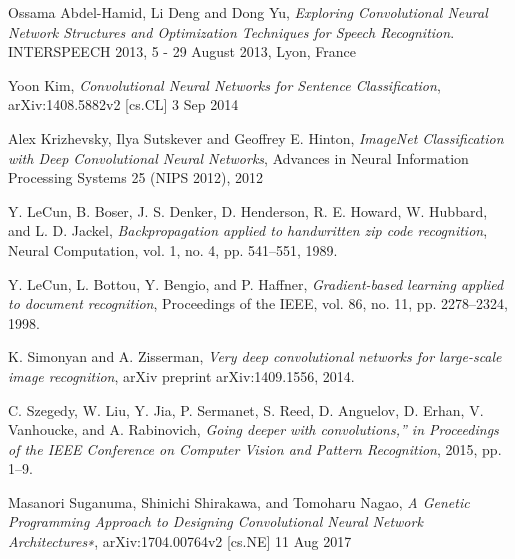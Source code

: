 \documentclass[conference]{IEEEtran}
\begin{document}
%
%
%
\begin{thebibliography}{}

Ossama Abdel-Hamid, Li Deng and Dong Yu, \emph{Exploring Convolutional Neural Network Structures and Optimization Techniques for Speech Recognition}. INTERSPEECH 2013, 5 - 29 August 2013, Lyon, France

Yoon Kim, \emph{Convolutional Neural Networks for Sentence Classification}, arXiv:1408.5882v2 [cs.CL] 3 Sep 2014

Alex Krizhevsky, Ilya Sutskever and Geoffrey E. Hinton, \emph{ImageNet Classification with Deep Convolutional Neural Networks}, Advances in Neural Information Processing Systems 25 (NIPS 2012), 2012

Y. LeCun, B. Boser, J. S. Denker, D. Henderson, R. E. Howard, W. Hubbard, and L. D. Jackel, \emph{Backpropagation applied to handwritten zip code recognition}, Neural Computation, vol. 1, no. 4, pp. 541–551, 1989. 

Y. LeCun, L. Bottou, Y. Bengio, and P. Haffner, \emph{Gradient-based learning applied to document recognition}, Proceedings of the IEEE, vol. 86, no. 11, pp. 2278–2324, 1998.

K. Simonyan and A. Zisserman, \emph{Very deep convolutional networks for large-scale image recognition}, arXiv preprint arXiv:1409.1556, 2014.

C. Szegedy, W. Liu, Y. Jia, P. Sermanet, S. Reed, D. Anguelov, D. Erhan, V. Vanhoucke, and A. Rabinovich, \emph{Going deeper with convolutions,” in Proceedings of the IEEE Conference on Computer Vision and Pattern Recognition}, 2015, pp. 1–9.

Masanori Suganuma, Shinichi Shirakawa, and Tomoharu Nagao, \emph{A Genetic Programming Approach to Designing Convolutional Neural Network Architectures∗}, arXiv:1704.00764v2  [cs.NE]  11 Aug 2017


\end{thebibliography}
\end{document}
